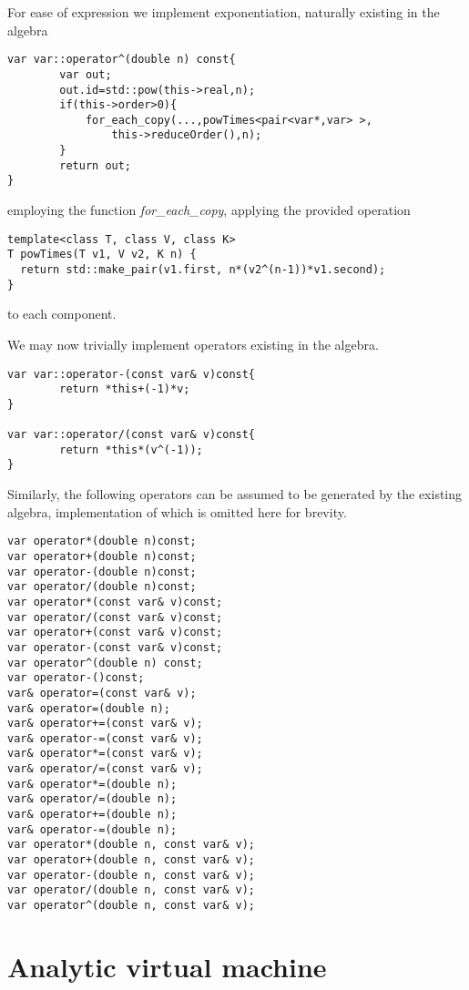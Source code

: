 \documentclass{article}
\begin{document}
For ease of expression we implement exponentiation, naturally existing in the algebra

\begin{lstlisting}
var var::operator^(double n) const{
		var out;
        out.id=std::pow(this->real,n);
        if(this->order>0){
        	for_each_copy(...,powTimes<pair<var*,var> >, 
        		this->reduceOrder(),n);
        }
        return out;
}
\end{lstlisting}
employing the function \emph{for\_each\_copy}, applying the provided operation 
\begin{lstlisting}
template<class T, class V, class K>
T powTimes(T v1, V v2, K n) {
  return std::make_pair(v1.first, n*(v2^(n-1))*v1.second);
}
\end{lstlisting}
to each component.

We may now trivially implement operators existing in the algebra.

\begin{lstlisting}
var var::operator-(const var& v)const{
		return *this+(-1)*v;
}

var var::operator/(const var& v)const{
		return *this*(v^(-1));
}
\end{lstlisting}

Similarly, the following operators can be assumed to be generated by the existing algebra, implementation of which is omitted here for brevity.

\begin{lstlisting}
var operator*(double n)const;
var operator+(double n)const;
var operator-(double n)const;
var operator/(double n)const;
var operator*(const var& v)const;
var operator/(const var& v)const;
var operator+(const var& v)const;
var operator-(const var& v)const;
var operator^(double n) const;
var operator-()const;
var& operator=(const var& v);
var& operator=(double n);
var& operator+=(const var& v);
var& operator-=(const var& v);
var& operator*=(const var& v);
var& operator/=(const var& v);
var& operator*=(double n);
var& operator/=(double n);
var& operator+=(double n);
var& operator-=(double n);
var operator*(double n, const var& v);
var operator+(double n, const var& v);
var operator-(double n, const var& v);
var operator/(double n, const var& v);
var operator^(double n, const var& v);
\end{lstlisting} 

\section{Analytic virtual machine}
\end{document}
